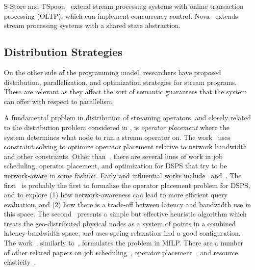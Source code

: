 S-Store and TSpoon~\cite{meehan2015s,affetti2020tspoon} extend stream processing systems with online transaction processing (OLTP), which can implement concurrency control.
Nova~\cite{zhao2021timestamped} extends stream processing systems with a shared state abstraction.

\subsection{Distribution Strategies}

On the other side of the programming model,
researchers have proposed distribution, parallelization, and optimization strategies for stream programs.
These are relevant as they affect the sort of semantic guarantees that the system can offer with respect to parallelism.

A fundamental problem in distribution of streaming operators, and closely related to the distribution problem considered in ,
is \emph{operator placement} where the system determines what node to run a stream operator on.
The work~\cite{cardellini2016optimal} uses constraint solving to optimize operator placement relative to network bandwidth and other constraints.
Other than~\cite{cardellini2016optimal}, there are several lines of work in job scheduling, operator placement, and optimization for DSPS that try to be network-aware in some fashion. Early and influential works include~\cite{ahmad2004network} and~\cite{pietzuch2006network}.
The first~\cite{ahmad2004network} is probably the first to formalize the operator placement problem for DSPS, and to explore (1) how network-awareness can lead to more efficient query evaluation, and (2) how there is a trade-off between latency and bandwidth use in this space.
The second~\cite{pietzuch2006network} presents a simple but effective heuristic algorithm which treats the geo-distributed physical nodes as a system of points in a combined latency-bandwidth space, and uses spring relaxation find a good configuration.
The work~\cite{gu2015general}, similarly to~\cite{cardellini2016optimal}, formulates the problem in MILP.
There are a number of other related papers on job scheduling~\cite{aniello2013adaptive,xu2014tstorm,eidenbenz2016task,wolf2008soda,fu2019edgewise}, operator placement~\cite{bonfils2004adaptive,tziritas2016improving,rizou2010solving,lakshmanan2008placement},
and resource elasticity~\cite{cardellini2018decentralized,hochreiner2016elastic,cardellini2018optimal,dias2018dsp-survey}.

